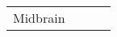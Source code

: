 \begin{table}[ht]
\begin{tabular}{l l l l}
            \multirow{4}{*}{Midbrain}
                                     & \multirow{4}{*}{\underline{\hspace{3cm}}}
                                     & \multirow{4}{*}{\underline{\hspace{3cm}}}
                                     & \underline{\hspace{3cm}}                                                                                             \\
                                     &                                                          &
                                     & \underline{\hspace{3cm}}                                                                                         \\
                                     &                                                          &
                                     & \underline{\hspace{3cm}}                                                                               \\
                                     &                                                          &
                                     & \underline{\hspace{3cm}}                                                                               \\
            \midrule


\end{tabular}
\end{table}
